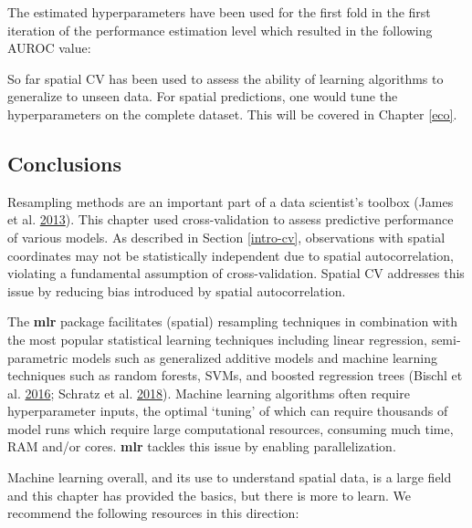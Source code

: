 \documentclass[]{krantz}
\newenvironment{Shaded}{\begin{snugshade}}{\end{snugshade}}
\newcommand{\CommentTok}[1]{\textcolor[rgb]{0.37,0.37,0.37}{\textit{#1}}}
\newcommand{\DecValTok}[1]{\textcolor[rgb]{0.06,0.06,0.06}{#1}}
\newcommand{\NormalTok}[1]{#1}
\newcommand{\OperatorTok}[1]{\textcolor[rgb]{0.43,0.43,0.43}{\textbf{#1}}}
\begin{document}
The estimated hyperparameters have been used for the first fold in the first iteration of the performance estimation level which resulted in the following AUROC value:

\begin{Shaded}
\end{Shaded}

So far spatial CV has been used to assess the ability of learning algorithms to generalize to unseen data.
For spatial predictions, one would tune the hyperparameters on the complete dataset.
This will be covered in Chapter \ref{eco}.

\hypertarget{conclusions}{%
\subsection{Conclusions}\label{conclusions}}

Resampling methods are an important part of a data scientist's toolbox (James et al. \protect\hyperlink{ref-james_introduction_2013}{2013}).
This chapter used cross-validation to assess predictive performance of various models.
As described in Section \ref{intro-cv}, observations with spatial coordinates may not be statistically independent due to spatial autocorrelation, violating a fundamental assumption of cross-validation.
Spatial CV addresses this issue by reducing bias introduced by spatial autocorrelation.

The \textbf{mlr} package facilitates (spatial) resampling techniques in combination with the most popular statistical learning techniques including linear regression, semi-parametric models such as generalized additive models and machine learning techniques such as random forests, SVMs, and boosted regression trees (Bischl et al. \protect\hyperlink{ref-bischl_mlr:_2016}{2016}; Schratz et al. \protect\hyperlink{ref-schratz_performance_nodate}{2018}).
Machine learning algorithms often require hyperparameter inputs, the optimal `tuning' of which can require thousands of model runs which require large computational resources, consuming much time, RAM and/or cores.
\textbf{mlr} tackles this issue by enabling parallelization.

Machine learning overall, and its use to understand spatial data, is a large field and this chapter has provided the basics, but there is more to learn.
We recommend the following resources in this direction:
\end{document}
